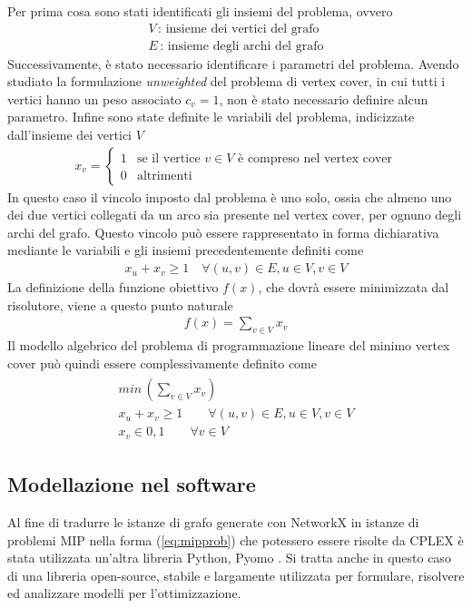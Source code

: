 \noindent
Per prima cosa sono stati identificati gli insiemi del problema, ovvero
\begin{align*}
V \,  : \, \mbox{insieme dei vertici del grafo}\\
E \, : \, \mbox{insieme degli archi del grafo}
\end{align*}
Successivamente, è stato necessario identificare i parametri del problema. Avendo studiato la formulazione \textit{unweighted} del problema di vertex cover, in cui tutti i vertici hanno un peso associato $c_v=1$, non è stato necessario definire alcun parametro.  Infine sono state definite le variabili del problema, indicizzate dall'insieme dei vertici $V$
\begin{align*}
x_v = \begin{cases}  1 & \mbox{se il vertice } v \in V \mbox{ è compreso nel vertex cover} \\ 0 & \mbox{altrimenti} \end{cases}
\end{align*}
In questo caso il vincolo imposto dal problema è uno solo, ossia che almeno uno dei due vertici collegati da un arco sia presente nel vertex cover, per ognuno degli archi del grafo. Questo vincolo può essere rappresentato in forma dichiarativa mediante le variabili e gli insiemi precedentemente definiti come
\begin{align*}
x_u + x_v \geq 1 \quad \forall (u,v) \in E,  u \in V, v \in V
\end{align*}
La definizione della funzione obiettivo $f(x)$, che dovrà essere minimizzata dal risolutore,  viene a questo punto naturale
\vspace{-0.5cm}
\begin{align*}
f(x) = \sum_{v \in V} x_v
\end{align*}
Il modello algebrico del problema di programmazione lineare del minimo vertex cover può quindi essere complessivamente definito come 
\begin{align}
    \label{eq:mipprob}
	\begin{array}{l}
      min\, (\sum_{v \in V} x_v)\\
      x_u + x_v \geq 1  \qquad \forall (u,v) \in E,  u \in V, v \in V \\
      x_v \in {0,1}  \qquad \forall v \in V 
    \end{array}
\end{align} 

\subsection{Modellazione nel software}
Al fine di tradurre le istanze di grafo generate con NetworkX in istanze di problemi MIP nella forma (\ref{eq:mipprob}) che potessero essere risolte da CPLEX è stata utilizzata un'altra libreria Python, Pyomo \cite{bynum2021pyomo}\cite{hart2011pyomo}. Si tratta anche in questo caso di una libreria open-source, stabile e largamente utilizzata per formulare, risolvere ed analizzare modelli per l'ottimizzazione.

